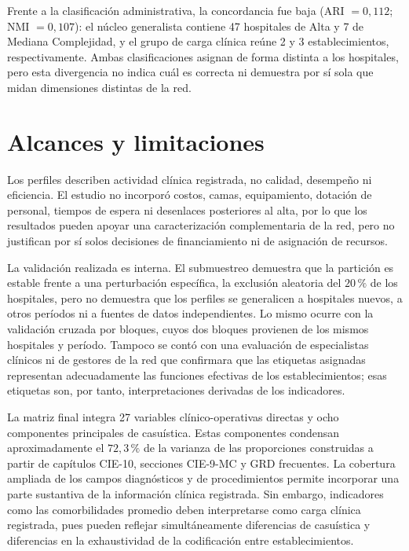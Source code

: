 Frente a la clasificación administrativa, la concordancia fue baja
(ARI $=0{,}112$; NMI $=0{,}107$): el núcleo generalista contiene 47 hospitales
de Alta y 7 de Mediana Complejidad, y el grupo de carga clínica reúne 2 y 3
establecimientos, respectivamente. Ambas clasificaciones asignan de forma
distinta a los hospitales, pero esta divergencia no indica cuál es correcta ni
demuestra por sí sola que midan dimensiones distintas de la red.

\section{Alcances y limitaciones}

Los perfiles describen actividad clínica registrada, no calidad, desempeño ni
eficiencia. El estudio no incorporó costos, camas, equipamiento, dotación de
personal, tiempos de espera ni desenlaces posteriores al alta, por lo que los
resultados pueden apoyar una caracterización complementaria de la red, pero no
justifican por sí solos decisiones de financiamiento ni de asignación de
recursos.

La validación realizada es interna. El submuestreo demuestra que la partición
es estable frente a una perturbación específica, la exclusión aleatoria del
$20\,\%$ de los hospitales, pero no demuestra que los perfiles se generalicen
a hospitales nuevos, a otros períodos ni a fuentes de datos independientes.
Lo mismo ocurre con la validación cruzada por bloques, cuyos dos bloques
provienen de los mismos hospitales y período. Tampoco se contó con una
evaluación de especialistas clínicos ni de gestores de la red que confirmara
que las etiquetas asignadas representan adecuadamente las funciones efectivas
de los establecimientos; esas etiquetas son, por tanto, interpretaciones
derivadas de los indicadores.

La matriz final integra 27 variables clínico-operativas directas y ocho
componentes principales de casuística. Estas componentes condensan
aproximadamente el $72{,}3\,\%$ de la varianza de las proporciones construidas a
partir de capítulos CIE-10, secciones CIE-9-MC y GRD frecuentes. La cobertura
ampliada de los campos diagnósticos y de procedimientos permite incorporar una
parte sustantiva de la información clínica registrada. Sin embargo, indicadores
como las comorbilidades promedio deben interpretarse como carga clínica
registrada, pues pueden reflejar simultáneamente diferencias de casuística y
diferencias en la exhaustividad de la codificación entre establecimientos.

